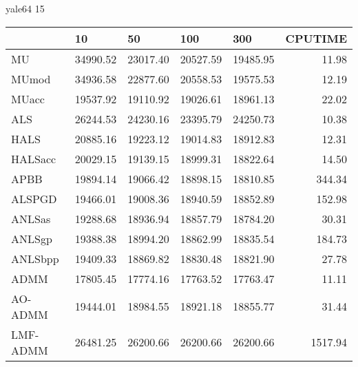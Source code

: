 \documentclass{article}
\begin{document}
yale64 15
\begin{table}[H]
	\centering
	\begin{tabular}{|l|r|r|r|r|r|}
		\hline
		& \multicolumn{1}{l|}{10} & \multicolumn{1}{l|}{50} & \multicolumn{1}{l|}{100} & \multicolumn{1}{l|}{300} & \multicolumn{1}{l|}{CPUTIME} \\ \hline
		MU       & 34990.52                & 23017.40                & 20527.59                 & 19485.95                 & 11.98                        \\ \hline
		MUmod    & 34936.58                & 22877.60                & 20558.53                 & 19575.53                 & 12.19                        \\ \hline
		MUacc    & 19537.92                & 19110.92                & 19026.61                 & 18961.13                 & 22.02                        \\ \hline
		ALS      & 26244.53                & 24230.16                & 23395.79                 & 24250.73                 & 10.38                        \\ \hline
		HALS     & 20885.16                & 19223.12                & 19014.83                 & 18912.83                 & 12.31                        \\ \hline
		HALSacc  & 20029.15                & 19139.15                & 18999.31                 & 18822.64                 & 14.50                        \\ \hline
		APBB     & 19894.14                & 19066.42                & 18898.15                 & 18810.85                 & 344.34                       \\ \hline
		ALSPGD   & 19466.01                & 19008.36                & 18940.59                 & 18852.89                 & 152.98                       \\ \hline
		ANLSas   & 19288.68                & 18936.94                & 18857.79                 & 18784.20                 & 30.31                        \\ \hline
		ANLSgp   & 19388.38                & 18994.20                & 18862.99                 & 18835.54                 & 184.73                       \\ \hline
		ANLSbpp  & 19409.33                & 18869.82                & 18830.48                 & 18821.90                 & 27.78                        \\ \hline
		ADMM     & 17805.45                & 17774.16                & 17763.52                 & 17763.47                 & 11.11                        \\ \hline
		AO-ADMM  & 19444.01                & 18984.55                & 18921.18                 & 18855.77                 & 31.44                        \\ \hline
		LMF-ADMM & 26481.25                & 26200.66                & 26200.66                 & 26200.66                 & 1517.94                      \\ \hline
	\end{tabular}
\end{table}
\end{document}
